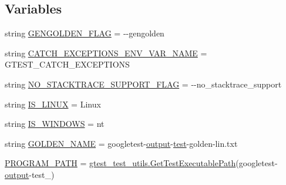 \subsection*{Variables}
\begin{DoxyCompactItemize}
\item 
string \mbox{\hyperlink{namespacegoogletest_1_1test_1_1googletest-output-test_ae8ed92d1b80670c2fef2d14e5752d3f2}{G\+E\+N\+G\+O\+L\+D\+E\+N\+\_\+\+F\+L\+AG}} = \textquotesingle{}-\/-\/gengolden\textquotesingle{}
\item 
string \mbox{\hyperlink{namespacegoogletest_1_1test_1_1googletest-output-test_a7cf3483092da91eb1d8212280dbebaf8}{C\+A\+T\+C\+H\+\_\+\+E\+X\+C\+E\+P\+T\+I\+O\+N\+S\+\_\+\+E\+N\+V\+\_\+\+V\+A\+R\+\_\+\+N\+A\+ME}} = \textquotesingle{}G\+T\+E\+S\+T\+\_\+\+C\+A\+T\+C\+H\+\_\+\+E\+X\+C\+E\+P\+T\+I\+O\+NS\textquotesingle{}
\item 
string \mbox{\hyperlink{namespacegoogletest_1_1test_1_1googletest-output-test_a6d6b31f6d4a75dc726bf1d7b21a1b89e}{N\+O\+\_\+\+S\+T\+A\+C\+K\+T\+R\+A\+C\+E\+\_\+\+S\+U\+P\+P\+O\+R\+T\+\_\+\+F\+L\+AG}} = \textquotesingle{}-\/-\/no\+\_\+stacktrace\+\_\+support\textquotesingle{}
\item 
string \mbox{\hyperlink{namespacegoogletest_1_1test_1_1googletest-output-test_a2270fb2b04b4046eef728638608b0ed1}{I\+S\+\_\+\+L\+I\+N\+UX}} = \textquotesingle{}Linux\textquotesingle{}
\item 
string \mbox{\hyperlink{namespacegoogletest_1_1test_1_1googletest-output-test_a427ad6a16b43c61d7733afb3571b0c78}{I\+S\+\_\+\+W\+I\+N\+D\+O\+WS}} = \textquotesingle{}nt\textquotesingle{}
\item 
string \mbox{\hyperlink{namespacegoogletest_1_1test_1_1googletest-output-test_a48529ecdda438cb5f92cdab8f181b6ab}{G\+O\+L\+D\+E\+N\+\_\+\+N\+A\+ME}} = \textquotesingle{}googletest-\/\mbox{\hyperlink{namespacegoogletest_1_1test_1_1googletest-output-test_a6773c2217ae4694b4db5610620562437}{output}}-\/\mbox{\hyperlink{_mutual_8h_a707ee03719e99670bf6cfdfd897b8456}{test}}-\/golden-\/lin.\+txt\textquotesingle{}
\item 
\mbox{\hyperlink{namespacegoogletest_1_1test_1_1googletest-output-test_a467b9ea0b4c6224d494db6c2ca568d19}{P\+R\+O\+G\+R\+A\+M\+\_\+\+P\+A\+TH}} = \mbox{\hyperlink{namespacegoogletest_1_1test_1_1gtest__test__utils_ac9af888c702350aac56b154a6af34098}{gtest\+\_\+test\+\_\+utils.\+Get\+Test\+Executable\+Path}}(\textquotesingle{}googletest-\/\mbox{\hyperlink{namespacegoogletest_1_1test_1_1googletest-output-test_a6773c2217ae4694b4db5610620562437}{output}}-\/test\+\_\+\textquotesingle{})

\end{DoxyCompactItemize}
